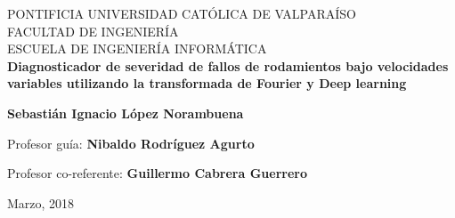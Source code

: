 \documentclass[a4paper,12pt]{article}
\begin{document}
\thispagestyle{empty}

\begin{center}
PONTIFICIA UNIVERSIDAD CATÓLICA DE VALPARAÍSO\\
FACULTAD DE INGENIERÍA\\
ESCUELA DE INGENIERÍA INFORMÁTICA\\

\vspace{4cm}
\Large{\textbf{Diagnosticador de severidad de fallos de rodamientos bajo velocidades variables utilizando la transformada de Fourier y Deep learning}}
\vspace{3cm}

\normalsize{\textbf{Sebastián Ignacio López Norambuena}}\\
\end{center}

\vspace{3cm}
\begin{center} 
Profesor guía: \textbf{Nibaldo Rodríguez Agurto}
\end{center}
\begin{center} 
Profesor co-referente: \textbf{Guillermo Cabrera Guerrero}
\end{center}
\vspace{1cm}
\begin{center} 
Marzo, 2018
\end{center}
\newpage


\newpage

\end{document}
